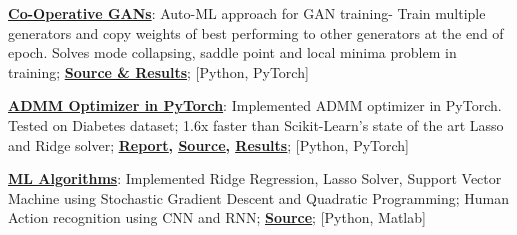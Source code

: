 \documentclass[a4paper, 11pt]{article}
\newcommand{\resumeItem}[2]{
  \item\small{
    \textbf{#1}{: #2 \vspace{-2pt}}
  }
}
\newcommand{\resumeSubItem}[2]{\resumeItem{#1}{#2}\vspace{-4pt}}
\begin{document}
    \resumeSubItem{\href{https://github.com/bhushan23/GAN/tree/master/Co-Operative-GAN}{Co-Operative GANs}}{Auto-ML approach for GAN training- Train multiple generators and copy weights of best performing to other generators at the end of epoch. Solves mode collapsing, saddle point and local minima problem in training;\textbf{ \href{https://github.com/bhushan23/GAN/tree/master/Co-Operative-GAN}{\underline{Source \& Results}}}; [Python, PyTorch]}
    \resumeSubItem{\href{https://github.com/bhushan23/pytorch/blob/1303c014dc3580654173c43fc6cf3409e4ef0438/torch/optim/admm.py}{ADMM Optimizer in PyTorch}}{Implemented ADMM optimizer in PyTorch. Tested on Diabetes dataset; 1.6x faster than Scikit-Learn's state of the art Lasso and Ridge solver; \textbf{\href{https://github.com/bhushan23/ADMM/blob/master/REPORT_ADMM_IN_PYTORCH.pdf}{\underline{Report}}, \href{https://github.com/bhushan23/pytorch/blob/1303c014dc3580654173c43fc6cf3409e4ef0438/torch/optim/admm.py}{\underline{Source}}, \href{https://github.com/bhushan23/ADMM}{\underline{Results}}}; [Python, PyTorch]}
    \resumeSubItem{\href{https://github.com/bhushan23/SBU-ML-Assignment}{ML Algorithms}}{Implemented Ridge Regression, Lasso Solver, Support Vector Machine using Stochastic Gradient Descent and Quadratic Programming; Human Action recognition using CNN and RNN; \textbf{\href{https://github.com/bhushan23/SBU-ML-Assignment}{\underline{Source}}}; [Python, Matlab]}
\end{document}

